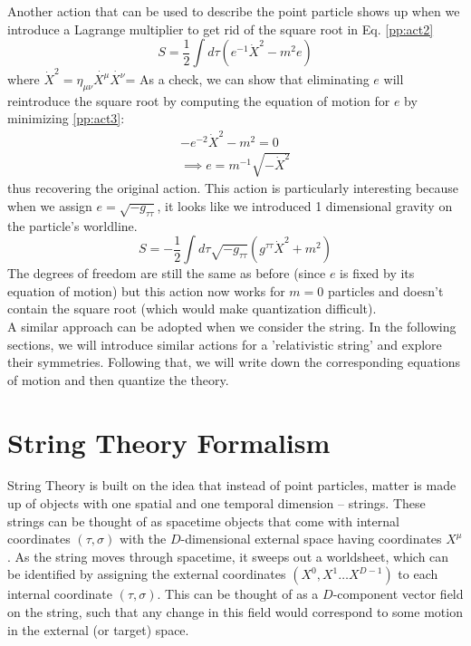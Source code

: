 \documentclass{article}
\providecommand{\brak}[1]{\ensuremath{\left(#1\right)}} %
\begin{document}
Another action that can be used to describe the point particle shows up when we introduce a Lagrange multiplier to get rid of the square root in Eq. \eqref{pp:act2}
\begin{equation}
	S = \frac{1}{2}\int d\tau \left({e^{-1}}\dot{X}^2 - m^2e \right) \label{pp:act3}
\end{equation}
where $\dot{X}^2 = \eta_{\mu\nu}\dot{X^\mu}\dot{X^\nu}$= As a check, we can show that eliminating $e$ will reintroduce the square root by computing the equation of motion for $e$ by minimizing \eqref{pp:act3}:
\begin{align}
    -e^{-2}\dot{X}^2-m^2=0\\
    \implies e = m^{-1} \sqrt{-\dot{X}^2}
\end{align}
thus recovering the original action. This action is particularly interesting because when we assign $e=\sqrt{-g_{\tau\tau}}$, it looks like we introduced 1 dimensional gravity on the particle's worldline. 
\begin{equation}
	S = -\frac{1}{2} \int d\tau \sqrt{-g_{\tau\tau}}\brak{g^{\tau\tau}\dot{X}^2 + m^2}
\end{equation}
The degrees of freedom are still the same as before (since $e$ is fixed by its equation of motion) but this action now works for $m=0$ particles and doesn't contain the square root (which would make quantization difficult).\\

A similar approach can be adopted when we consider the string. In the following sections, we will introduce similar actions for a 'relativistic string' and explore their symmetries. Following that, we will write down the corresponding equations of motion and then quantize the theory.  




\section{String Theory Formalism}
String Theory is built on the idea that instead of point particles, matter is made up of objects with one spatial and one temporal dimension -- strings. These strings can be thought of as spacetime objects that come with internal coordinates $(\tau,\sigma)$  with the $D$-dimensional external space having coordinates $X^\mu$. As the string moves through spacetime, it sweeps out a worldsheet, which can be identified by assigning the external coordinates $(X^0,X^1\dots X^{D-1})$ to each internal coordinate $(\tau,\sigma)$. This can be thought of as a $D$-component vector field on the string, such that any change in this field would correspond to some motion in the external (or target) space.\\
\end{document}
